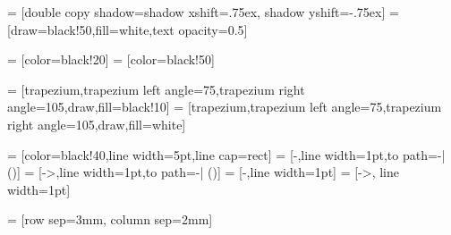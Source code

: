  = [double copy shadow={shadow xshift=.75ex, shadow yshift=-.75ex}]
 = [draw=black!50,fill=white,text opacity=0.5]

 = [color=black!20]
 = [color=black!50]

\newcommand{\dataRightAngle}{105}
\newcommand{\dataLeftAngle}{75}

 = [trapezium,trapezium left angle=\dataLeftAngle,trapezium right angle=\dataRightAngle,draw,fill=black!10]
 = [trapezium,trapezium left angle=\dataLeftAngle,trapezium right angle=\dataRightAngle,draw,fill=white]

 = [color=black!40,line width=5pt,line cap=rect]
 = [-,line width=1pt,to path={-| (\tikztotarget)}]
 = [->,line width=1pt,to path={-| (\tikztotarget)}]
 = [-,line width=1pt]
 = [->, line width=1pt]

 = [row sep=3mm, column sep=2mm]



\newcommand{\MultilineComponent}[2]
{
	\begin{minipage}{#1}
	\begin{center}
		#2
	\end{center}
	\end{minipage}
}

\newcommand{\TwolineComponent}[3]
{
	\begin{minipage}{#1}
	\begin{center}
		#2 \linebreak #3
	\end{center}
	\end{minipage}
}

\newcommand{\ThreelineComponent}[4]
{
	\begin{minipage}{#1}
	\begin{center}
		#2 \linebreak #3 \linebreak #4
	\end{center}
	\end{minipage}
}


